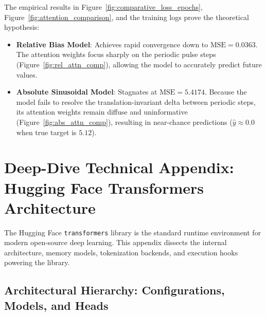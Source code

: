 \documentclass[11pt,a4paper]{article}
\begin{document}
The empirical results in Figure~\ref{fig:comparative_loss_epochs}, Figure~\ref{fig:attention_comparison}, and the training logs prove the theoretical hypothesis:
\begin{itemize}
    \item \textbf{Relative Bias Model}: Achieves rapid convergence down to $\text{MSE} = \mathbf{0.0363}$. The attention weights focus sharply on the periodic pulse steps (Figure~\ref{fig:rel_attn_comp}), allowing the model to accurately predict future values.
    \item \textbf{Absolute Sinusoidal Model}: Stagnates at $\text{MSE} = \mathbf{5.4174}$. Because the model fails to resolve the translation-invariant delta between periodic steps, its attention weights remain diffuse and uninformative (Figure~\ref{fig:abs_attn_comp}), resulting in near-chance predictions ($\hat{y} \approx 0.0$ when true target is $5.12$).
\end{itemize}


\newpage
\appendix
\section{Deep-Dive Technical Appendix: Hugging Face Transformers Architecture}

The Hugging Face \texttt{transformers} library is the standard runtime environment for modern open-source deep learning. This appendix dissects the internal architecture, memory models, tokenization backends, and execution hooks powering the library.

\subsection{Architectural Hierarchy: Configurations, Models, and Heads}
\end{document}
